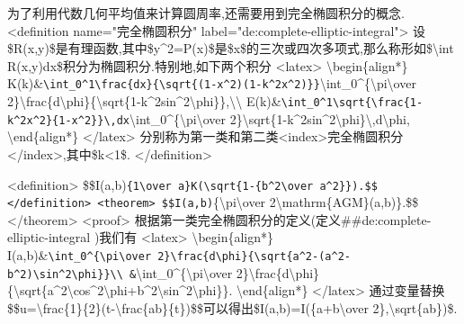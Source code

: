 \documentclass[
]{article}
\begin{document}
为了利用代数几何平均值来计算圆周率,还需要用到完全椭圆积分的概念.
\textless definition name="完全椭圆积分"
label="de:complete-elliptic-integral"\textgreater{}
设\$R(x,y)\$是有理函数,其中\$y\^{}2=P(x)\$是\$x\$的三次或四次多项式,那么称形如\$\textbackslash int
R(x,y)dx\$积分为椭圆积分.特别地,如下两个积分
\textless latex\textgreater{} \textbackslash begin\{align*\}
K(k)\&\texttt{\textbackslash{}int\_0\^{}1\textbackslash{}frac\{dx\}\{\textbackslash{}sqrt\{(1-x\^{}2)(1-k\^{}2x\^{}2)\}\}}\textbackslash int\_0\^{}\{\textbackslash pi\textbackslash over
2\}\textbackslash frac\{d\textbackslash phi\}\{\textbackslash sqrt\{1-k\^{}2sin\^{}2\textbackslash phi\}\},\textbackslash\textbackslash{}
E(k)\&\texttt{\textbackslash{}int\_0\^{}1\textbackslash{}sqrt\{\textbackslash{}frac\{1-k\^{}2x\^{}2\}\{1-x\^{}2\}\}\textbackslash{},dx}\textbackslash int\_0\^{}\{\textbackslash pi\textbackslash over
2\}\textbackslash sqrt\{1-k\^{}2sin\^{}2\textbackslash phi\}\textbackslash,d\textbackslash phi,
\textbackslash end\{align*\} \textless/latex\textgreater{}
分别称为第一类和第二类\textless index\textgreater 完全椭圆积分\textless/index\textgreater,其中\$\textbar k\textbar\textless1\$.
\textless/definition\textgreater{}

\textless definition\textgreater{}
\$\$I(a,b)\texttt{\{1\textbackslash{}over\ a\}K(\textbackslash{}sqrt\{1-\{b\^{}2\textbackslash{}over\ a\^{}2\}\}).\$\$
\textless{}/definition\textgreater{}
\textless{}theorem\textgreater{}
\$\$I(a,b)}\{\textbackslash pi\textbackslash over
2\textbackslash mathrm\{AGM\}(a,b)\}.\$\$
\textless/theorem\textgreater{} \textless proof\textgreater{}
根据第一类完全椭圆积分的定义(定义\#\#de:complete-elliptic-integral
)我们有 \textless latex\textgreater{} \textbackslash begin\{align*\}
I(a,b)\&\texttt{\textbackslash{}int\_0\^{}\{\textbackslash{}pi\textbackslash{}over\ 2\}\textbackslash{}frac\{d\textbackslash{}phi\}\{\textbackslash{}sqrt\{a\^{}2-(a\^{}2-b\^{}2)\textbackslash{}sin\^{}2\textbackslash{}phi\}\}\textbackslash{}\textbackslash{}
\&}\textbackslash int\_0\^{}\{\textbackslash pi\textbackslash over
2\}\textbackslash frac\{d\textbackslash phi\}\{\textbackslash sqrt\{a\^{}2\textbackslash cos\^{}2\textbackslash phi+b\^{}2\textbackslash sin\^{}2\textbackslash phi\}\}.
\textbackslash end\{align*\} \textless/latex\textgreater{}
通过变量替换\$\$u=\textbackslash frac\{1\}\{2\}(t-\textbackslash frac\{ab\}\{t\})\$\$可以得出\$I(a,b)=I(\{a+b\textbackslash over
2\},\textbackslash sqrt\{ab\})\$.
\end{document}
